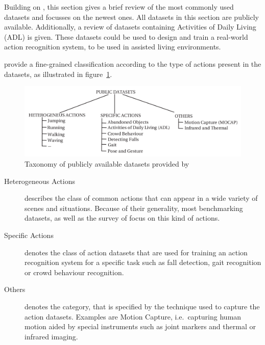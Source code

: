 Building on \cite{chaquet_survey_2013}, this section gives a brief review of the most commonly used datasets and focusses on the newest ones.
All datasets in this section are publicly available.
Additionally, a review of datasets containing Activities of Daily Living (ADL) is given.
These datasets could be used to design and train a real-world action recognition system, to be used in assisted living environments.

\textcite{chaquet_survey_2013} provide a fine-grained classification according to the type of actions present in the datasets, as illustrated in figure~\ref{fig:datasetssurvey_taxonomy}.
\begin{figure}[H]
    \centering
    \includegraphics[width=\textwidth]{img_datasets/datasetssurvey_taxonomy}
    \caption{Taxonomy of publicly available datasets provided by \cite{chaquet_survey_2013}}
    \label{fig:datasetssurvey_taxonomy}
\end{figure}
\begin{description}
    \item[Heterogeneous Actions] describes the class of common actions that can appear in a wide variety of scenes and situations.
        Because of their generality, most benchmarking datasets, as well as the survey of \textcite{chaquet_survey_2013} focus on this kind of actions.
    \item[Specific Actions] denotes the class of action datasets that are used for training an action recognition system for a specific task such as fall detection, gait recognition or crowd behaviour recognition.
    \item[Others] denotes the category, that is specified by the technique used to capture the action datasets. Examples are Motion Capture, i.e.\ capturing human motion aided by special instruments such as joint markers and thermal or infrared imaging.
\end{description}

